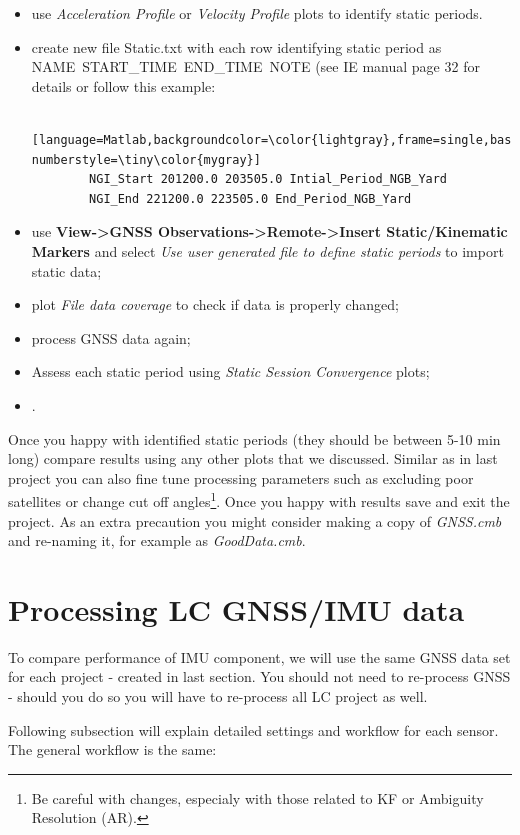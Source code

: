 \documentclass[11pt,fleqn]{book} %
\begin{document}
\begin{itemize}
\item use \emph{Acceleration Profile} or \emph{Velocity Profile} plots to identify static periods.
\item create new file Static.txt with each row identifying static period as NAME~START\_TIME~END\_TIME~NOTE (see IE manual page 32 for details or follow this example: 
	\begin{lstlisting} [language=Matlab,backgroundcolor=\color{lightgray},frame=single,basicstyle=\footnotesize,numbers=left,numbersep=5pt, numberstyle=\tiny\color{mygray}]
		NGI_Start 201200.0 203505.0 Intial_Period_NGB_Yard
		NGI_End 221200.0 223505.0 End_Period_NGB_Yard
	\end{lstlisting}
\item use \textbf{View->GNSS Observations->Remote->Insert Static/Kinematic Markers} and select \textit{Use user generated file to define static periods} to import static data;
\item plot \textit{File data coverage} to check if data is properly changed;
\item process GNSS data again;
\item Assess each static period using \emph{Static Session Convergence} plots; 
\item .
\end{itemize}

Once you happy with identified static periods (they should be between 5-10 min long) compare results using any other plots that we discussed. Similar as in last project you can also fine tune processing parameters such as excluding poor satellites or change cut off angles\footnote{Be careful with changes, especialy with those related to KF or Ambiguity Resolution (AR).}. Once you happy with results save and exit the project. As an extra precaution you might consider making a copy of \textit{GNSS.cmb} and re-naming it, for example as \textit{GoodData.cmb}.


\chapter{Processing LC GNSS/IMU data\label{sec:Processing-Loosely-Coupled}}

To compare performance of IMU component, we will use the same GNSS data set for each project - created in last section. You should not need to re-process GNSS - should you do so you will have to re-process all LC project as well.  

Following subsection will explain detailed settings and workflow for each sensor. The general workflow is the same:
\end{document}
